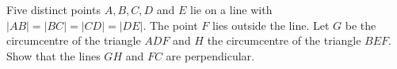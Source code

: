 Five distinct points $A,B,C,D$ and $E$ lie on a line with $|AB|=|BC|=|CD|=|DE|$. The point $F$ lies outside the line. Let $G$ be the circumcentre of the triangle $ADF$ and $H$ the circumcentre of the triangle $BEF$. Show that the lines $GH$ and $FC$ are perpendicular.